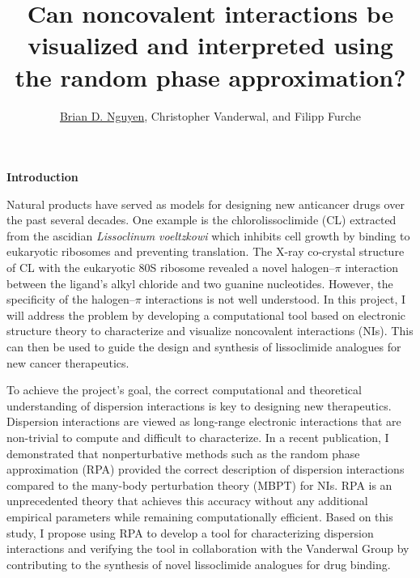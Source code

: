 \documentclass[11pt]{article}
\title{\vspace{-0.8in}\textbf{Can noncovalent interactions be visualized
    and interpreted using the random phase approximation?}}
\author{\underline{Brian D. Nguyen}, Christopher Vanderwal, and Filipp Furche}
\date{}%
\begin{document}
\maketitle
\vspace{-0.4in}

\textbf{Introduction}

Natural products have served as models for designing new anticancer
drugs over the past several decades.\autocite{Dias12Metabolites2p303,Butler04JNatProd67p2141}
One example is the chlorolissoclimide (CL) extracted from the ascidian
\textit{Lissoclinum voeltzkowi} which inhibits cell growth by binding to
eukaryotic ribosomes and preventing translation.\autocite{Robert06RNA12p717}
The X-ray co-crystal structure of CL with the eukaryotic 80S ribosome revealed
a novel halogen--$\pi$ interaction between the ligand's alkyl chloride and two
guanine nucleotides.\autocite{Imai08ProteinScience17p1129,Konst2017} 
However, the specificity of the halogen--$\pi$ interactions is not well
understood. In this project, I will address the problem by developing a
computational tool based on electronic structure theory to characterize
and visualize noncovalent interactions (NIs). This can then be used to
guide the design and synthesis of lissoclimide analogues for new cancer
therapeutics.

To achieve the project's goal, the correct computational and theoretical
understanding of dispersion interactions is key to designing new therapeutics.
Dispersion interactions are viewed as long-range electronic interactions that
are non-trivial to compute and difficult to characterize. In a recent publication,
I demonstrated that nonperturbative methods such as the random phase approximation
(RPA) provided the correct description of dispersion interactions compared
to the many-body perturbation theory (MBPT) for NIs.\autocite{Nguyen20JChemTheoryComput16p2258}
RPA is an unprecedented theory that achieves this accuracy without any
additional empirical parameters while remaining computationally efficient.\autocite{doi:10.1063/1.3442749}
Based on this study, I propose using RPA to develop a tool for characterizing
dispersion interactions and verifying the tool in collaboration with the
Vanderwal Group by contributing to the synthesis of novel lissoclimide analogues
for drug binding.
\end{document}
